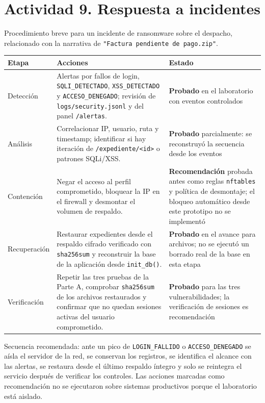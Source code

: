 \documentclass[letterpaper]{article}
\begin{document}
\section{Actividad 9. Respuesta a incidentes}
\label{sec:orgace8796}

Procedimiento breve para un incidente de ransomware sobre el despacho, relacionado con
la narrativa de \texttt{"Factura pendiente de pago.zip"}.

\begin{center}
\begin{tabular}{lll}
Etapa & Acciones & Estado\\
\hline
Detección & Alertas por fallos de login, \texttt{SQLI\_DETECTADO}, \texttt{XSS\_DETECTADO} y \texttt{ACCESO\_DENEGADO}; revisión de \texttt{logs/security.jsonl} y del panel \texttt{/alertas}. & \textbf{Probado} en el laboratorio con eventos controlados\\
Análisis & Correlacionar IP, usuario, ruta y timestamp; identificar si hay iteración de \texttt{/expediente/<id>} o patrones SQLi/XSS. & \textbf{Probado} parcialmente: se reconstruyó la secuencia desde los eventos\\
Contención & Negar el acceso al perfil comprometido, bloquear la IP en el firewall y desmontar el volumen de respaldo. & \textbf{Recomendación} probada antes como reglas \texttt{nftables} y política de desmontaje; el bloqueo automático desde este prototipo no se implementó\\
Recuperación & Restaurar expedientes desde el respaldo cifrado verificado con \texttt{sha256sum} y reconstruir la base de la aplicación desde \texttt{init\_db()}. & \textbf{Probado} en el avance para archivos; no se ejecutó un borrado real de la base en esta etapa\\
Verificación & Repetir las tres pruebas de la Parte A, comprobar \texttt{sha256sum} de los archivos restaurados y confirmar que no quedan sesiones activas del usuario comprometido. & \textbf{Probado} para las tres vulnerabilidades; la verificación de sesiones es recomendación\\
\end{tabular}
\end{center}

Secuencia recomendada: ante un pico de \texttt{LOGIN\_FALLIDO} o \texttt{ACCESO\_DENEGADO} se aísla el
servidor de la red, se conservan los registros, se identifica el alcance con las
alertas, se restaura desde el último respaldo íntegro y solo se reintegra el servicio
después de verificar los controles. Las acciones marcadas como recomendación no se
ejecutaron sobre sistemas productivos porque el laboratorio está aislado.
\end{document}
